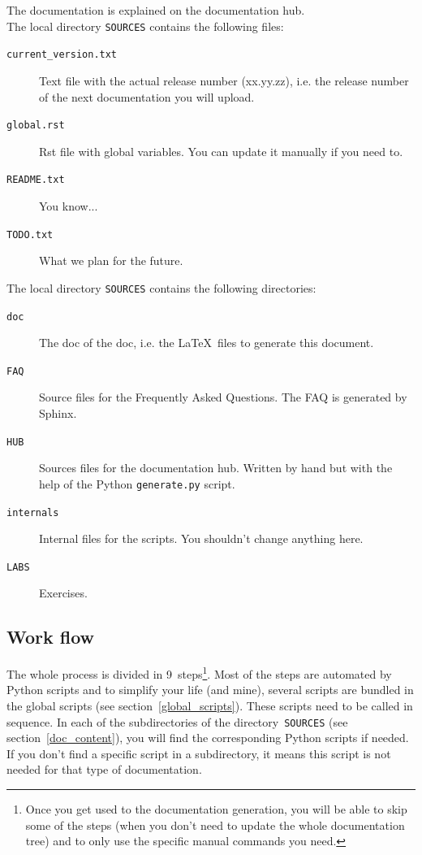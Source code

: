 \documentclass[a4paper,10pt]{article}
\newcommand{\code}[1]{\texttt{#1}}
\begin{document}
The documentation is explained on the documentation hub.\\

The local directory \code{SOURCES} contains the following files:

\begin{description}
 \item[\code{current\_version.txt}] Text file with the actual release number (xx.yy.zz), i.e. the release number of the next documentation you will upload.
 \item[\code{global.rst}] Rst file with global variables. You can update it manually if you need to.
 \item[\code{README.txt}] You know...
 \item[\code{TODO.txt}] What we plan for the future.
\end{description}

The local directory \code{SOURCES} contains the following directories:

\begin{description}
 \item[\code{doc}] The doc of the doc, i.e. the \LaTeX\ files to generate this document.
 \item[\code{FAQ}] Source files for the Frequently Asked Questions. The FAQ is generated by Sphinx.
 \item[\code{HUB}] Sources files for the documentation hub. Written by hand but with the help of the Python \code{generate.py} script.
 \item[\code{internals}] Internal files for the scripts. You shouldn't change anything here.
 \item[\code{LABS}] Exercises. 
\end{description}

\subsection{Work flow}

The whole process is divided in 9~steps\footnote{Once you get used to the documentation generation, you will be able to skip some of the steps (when you don't need to update the whole documentation tree) and to only use the specific manual commands you need.}. Most of the steps are automated by Python scripts and to simplify your life (and mine), several scripts are bundled in the global scripts (see section~\ref{global_scripts}). These scripts need to be called in sequence. In each of the subdirectories of the directory~\code{SOURCES} (see section~\ref{doc_content}), you will find the corresponding Python scripts if needed. If you don't 
find a specific script in a subdirectory, it means this script is not needed for that type of documentation.\\
\end{document}
